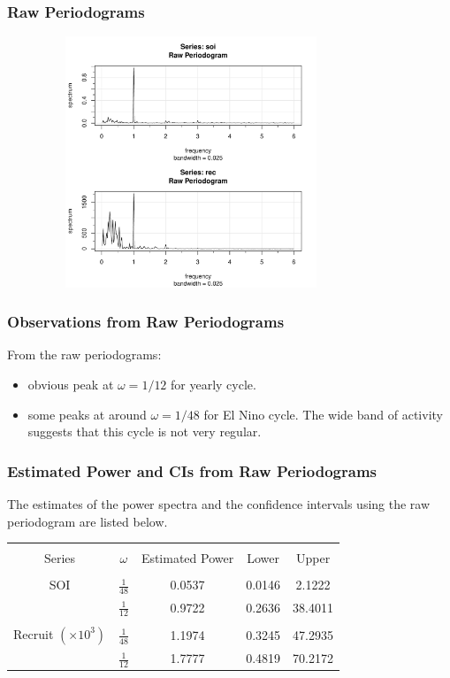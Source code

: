 \documentclass[%
xcolor=pdftex]{beamer}
\begin{document}
\begin{frame}
\frametitle{Raw Periodograms}

\includegraphics[width=110mm, height=75mm]{periodogram.pdf}

\end{frame}

\begin{frame}
\frametitle{Observations from Raw Periodograms}

From the raw periodograms:

\begin{itemize}
\item obvious peak at $\omega = 1/12$ for yearly cycle.
\item some peaks at around $\omega = 1/48$ for El Nino cycle. The wide band of activity suggests that this cycle is not very regular.
\end{itemize}

\end{frame}

\begin{frame}
\frametitle{Estimated Power and CIs from Raw Periodograms}

The estimates of the power spectra and the confidence intervals using the raw periodogram are listed below.

\begin{center}
\begin{tabular}{ccccc}
\hline \\
Series & $\omega$ & Estimated Power & Lower & Upper \\
\hline \\
SOI & $\frac{1}{48}$ & 0.0537 & 0.0146 & 2.1222 \\
    & $\frac{1}{12}$ & 0.9722 & 0.2636 & 38.4011 \\
    \hline\\
Recruit $(\times 10^3)$ & $\frac{1}{48}$ & 1.1974 & 0.3245 & 47.2935 \\
                        & $\frac{1}{12}$ & 1.7777 & 0.4819 & 70.2172 \\
\hline
\end{tabular}
\end{center}

\end{frame}
\end{document}

